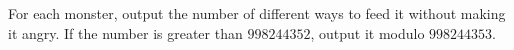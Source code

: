 For each monster, output the number of different ways to feed it
without making it angry.
If the number is greater than $998244352$, output it modulo $998244353$.
